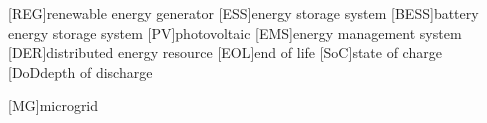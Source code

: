 \begin{acronym}
    [REG]{renewable energy generator}
    [ESS]{energy storage system}
    [BESS]{battery energy storage system}
    [PV]{photovoltaic}
    [EMS]{energy management system}
    [DER]{distributed energy resource}
    [EOL]{end of life}
    [SoC]{state of charge}
    [DoD{depth of discharge}

    [MG]{microgrid}
\end{acronym}